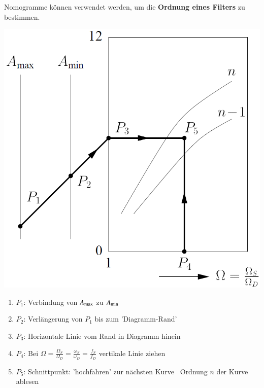 Nomogramme können verwendet werden, um die \textbf{Ordnung eines Filters}  zu bestimmen.

\begin{minipage}[c]{0.42\columnwidth}
    \includegraphics[width=\columnwidth]{images/filter_nomogramme.png}
\end{minipage}
\hfill
\begin{minipage}[c]{0.56\columnwidth}
    \begin{center}
        \textbf{}
    \end{center}
    
    \begin{enumerate}
        \item $P_1$: Verbindung von $A_{\rm max}$ zu $A_{\rm min}$
        \item $P_2$: Verlängerung von $P_1$ bis zum 'Diagramm-Rand'
        \item $P_3$: Horizontale Linie vom Rand in Diagramm hinein
        \item $P_4$: Bei $\Omega = \frac{\Omega_S}{\Omega_D} = \frac{\omega_S}{\omega_D} = \frac{f_S}{f_D}$ vertikale Linie ziehen
        \item $P_5$: Schnittpunkt: 'hochfahren' zur nächsten Kurve \textrightarrow\ Ordnung $n$ der Kurve ablesen
    \end{enumerate}
\end{minipage}


